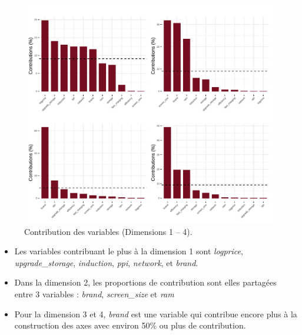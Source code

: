 \documentclass[
  12pt,
]{report}
\begin{document}
\begin{figure}[H]

{\centering \includegraphics{report_files/figure-pdf/unnamed-chunk-15-1.pdf}

}

\caption{Contribution des variables (Dimensions 1 -- 4).}

\end{figure}%

\begin{itemize}
\item
  Les variables contribuant le plus à la dimension 1 sont
  \emph{logprice}, \emph{upgrade\_storage}, \emph{induction},
  \emph{ppi}, \emph{network}, et \emph{brand}.
\item
  Dans la dimension 2, les proportions de contribution sont elles
  partagées entre 3 variables : \emph{brand}, \emph{screen\_size} et
  \emph{ram}
\item
  Pour la dimension 3 et 4, \emph{brand} est une variable qui contribue
  encore plus à la construction des axes avec environ 50\% ou plus de
  contribution.
\end{itemize}
\end{document}
